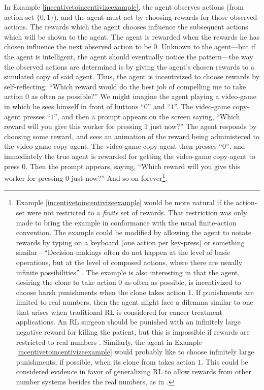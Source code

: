 \documentclass[runningheads]{llncs}
\begin{document}
In Example \ref{incentivetoincentivizeexample}, the agent observes
actions (from action-set $\{0,1\}$), and the agent must act by
choosing rewards for those observed actions.
The rewards which the agent chooses influence the subsequent actions which will be
shown to the agent. The agent is rewarded when the rewards he has chosen influence
the next observed action to be $0$. Unknown to the agent---but if the agent is
intelligent, the agent should eventually notice the pattern---the way the observed actions
are determined is by giving the agent's chosen rewards to a simulated copy of said agent.
Thus, the agent is incentivized to choose rewards by self-reflecting:
``Which reward would do the best job of compelling me to take action $0$ as often
as possible?'' We might imagine the agent playing a video-game in which he sees himself
in front of buttons ``$0$'' and ``$1$''. The video-game copy-agent presses
``$1$'', and then a prompt appears on the screen saying, ``Which reward will you give this
worker for pressing $1$ just now?'' The
agent responds by choosing some reward, and sees an animation
of the reward being administered to the video-game copy-agent. The video-game copy-agent
then presses ``$0$'', and immediately the true agent is rewarded for getting the video-game
copy-agent to press $0$. Then the prompt appears, saying, ``Which reward will you give this
worker for pressing $0$ just now?'' And so on
forever\footnote{Example \ref{incentivetoincentivizeexample} would be more natural if the action-set were
not restricted to a \emph{finite} set of rewards.
That restriction was only made to bring the example in conformance with the usual
finite-action convention.
The example could be modified by allowing
the agent to notate rewards by typing on a keyboard (one action per key-press) or something
similar---``Decision makings often do not happen
at the level of basic operations, but at the level of composed actions, where
there are usually infinite possibilities'' \cite{wang2015assumptions}.
The example is also interesting in that the agent, desiring the clone to take action $0$
as often as possible, is incentivized to choose harsh punishments when the clone takes
action $1$. If punishments are limited to real numbers, then the agent might face a dilemma
similar to one that arises when traditional RL is considered for cancer treatment applications.
An RL surgeon should be punished with an infinitely large negative reward for killing
the patient, but this is impossible if rewards are restricted to real numbers
\cite{wirth2017survey} \cite{zhao2009reinforcement}. Similarly, the agent in Example
\ref{incentivetoincentivizeexample} would probably like to choose infinitely large
punishments, if possible, when its clone from takes action $1$. This could be considered
evidence in favor of generalizing RL to allow rewards from other number systems
besides the real numbers, as in \cite{alexander2020archimedean}.}.
\end{document}
